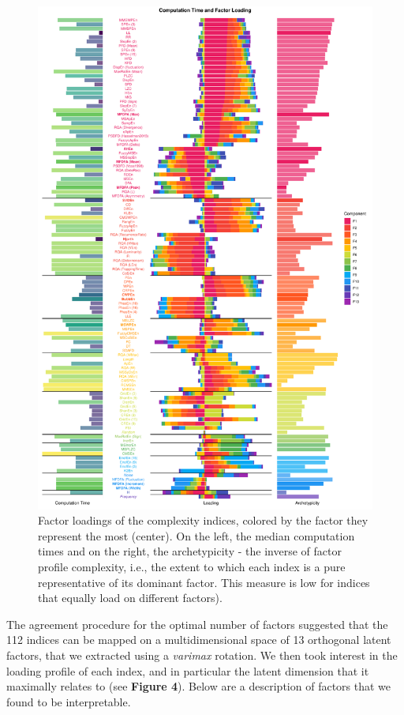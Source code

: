\documentclass[
  man]{apa6}
\begin{document}
\begin{figure}
\centering
\includegraphics{./figures/loadings-1.pdf}
\caption{\label{fig:loadings}Factor loadings of the complexity indices, colored by the factor they represent the most (center). On the left, the median computation times and on the right, the archetypicity - the inverse of factor profile complexity, i.e., the extent to which each index is a pure representative of its dominant factor. This measure is low for indices that equally load on different factors).}
\end{figure}

The agreement procedure for the optimal number of factors suggested that the 112 indices can be mapped on a multidimensional space of 13 orthogonal latent factors, that we extracted using a \emph{varimax} rotation. We then took interest in the loading profile of each index, and in particular the latent dimension that it maximally relates to (see \textbf{Figure 4}). Below are a description of factors that we found to be interpretable.
\end{document}
